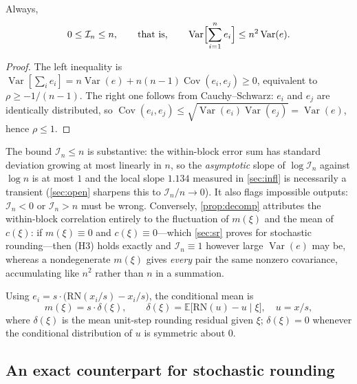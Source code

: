 \documentclass[review,hidelinks,oneeqnum,onetabnum,onefignum,onethmnum]{siamart251216}
\begin{document}
\begin{corollary}
\label{cor:bounds}
Always,
\begin{equation}
0\le \mathcal I_n\le n ,
\qquad\text{that is,}\qquad
\operatorname{Var}\Bigl[\sum_{i=1}^{n}e_i\Bigr]\le n^2\operatorname{Var}(e).
\label{eq:bounds}
\end{equation}
\end{corollary}

\begin{proof}
The left inequality is
$\operatorname{Var}[\sum_i e_i]=n\operatorname{Var}(e)+n(n-1)\operatorname{Cov}(e_i,e_j)\ge0$,
equivalent to $\rho\ge-1/(n-1)$. The right one follows from Cauchy--Schwarz:
$e_i$ and $e_j$ are identically distributed, so
$\operatorname{Cov}(e_i,e_j)\le\sqrt{\operatorname{Var}(e_i)\operatorname{Var}(e_j)}=\operatorname{Var}(e)$,
hence $\rho\le1$.
\end{proof}

\begin{remark}
The bound $\mathcal I_n\le n$ is substantive: the within-block error sum has
standard deviation growing at most linearly in $n$, so the \emph{asymptotic}
slope of $\log\mathcal I_n$ against $\log n$ is at most $1$ and the local slope
$1.134$ measured in \cref{sec:infl} is necessarily a transient
(\cref{sec:open} sharpens this to $\mathcal I_n/n\to0$). It also flags
impossible outputs: $\mathcal I_n<0$ or $\mathcal I_n>n$ must be wrong.
Conversely, \cref{prop:decomp} attributes the within-block correlation entirely
to the fluctuation of $m(\xi)$ and the mean of $c(\xi)$: if $m(\xi)\equiv0$ and
$c(\xi)\equiv0$---which \cref{sec:sr} proves for stochastic rounding---then (H3)
holds exactly and $\mathcal I_n\equiv1$ however large $\operatorname{Var}(e)$ may
be, whereas a nondegenerate $m(\xi)$ gives \emph{every} pair the same nonzero
covariance, accumulating like $n^2$ rather than $n$ in a summation.
\end{remark}

Using $e_i=s\cdot\bigl(\mathrm{RN}(x_i/s)-x_i/s\bigr)$, the conditional mean is
\begin{equation}
m(\xi)=s\cdot\delta(\xi),\qquad
\delta(\xi)=\mathbb{E}\bigl[\mathrm{RN}(u)-u \mid \xi\bigr],\quad u=x/s,
\label{eq:mxi}
\end{equation}
where $\delta(\xi)$ is the mean unit-step rounding residual given $\xi$;
$\delta(\xi)=0$ whenever the conditional distribution of $u$ is symmetric about
$0$.

\subsection{An exact counterpart for stochastic rounding}
\label{sec:srtheory}
\end{document}
